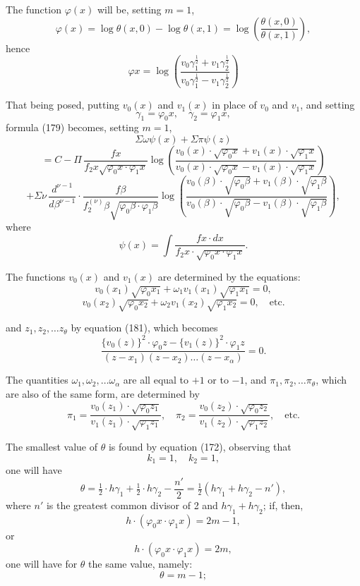 \documentclass{article}
\begin{document}
The function $\varphi(x)$ will be, setting $m = 1$,
\[ \varphi(x) = \log\theta(x,0)-\log\theta(x,1) = \log\left(\frac{\theta(x,0)}{\theta(x,1)}\right), \]
hence
\[ \varphi x = \log\left(\frac{v_0\gamma_1^{\frac{1}{2}}+v_1\gamma_2^{\frac{1}{2}}}{v_0\gamma_1^{\frac{1}{2}}-v_1\gamma_2^{\frac{1}{2}}}\right) \]

That being posed, putting $v_0(x)$ and $v_1(x)$ in place of $v_0$ and $v_1$, and setting
\[ \gamma_1 = \varphi_0 x, \quad \gamma_2 = \varphi_1 x, \]
formula (179) becomes, setting $m = 1$,
\[ \Sigma\omega\psi(x)+\Sigma\pi\psi(z) \]
\[ = C - \Pi\,\frac{f x}{f_2 x\sqrt{\varphi_0 x \cdot \varphi_1 x}}\log\left(\frac{v_0(x) \cdot \sqrt{\varphi_0 x}+v_1(x) \cdot \sqrt{\varphi_1 x}}{v_0(x) \cdot \sqrt{\varphi_0 x}-v_1(x) \cdot \sqrt{\varphi_1 x}}\right) \]
\[ + \Sigma\nu\,\frac{d^{\nu-1}}{d\beta^{\nu-1}} \cdot \frac{f\beta}{f_2^{(\nu)}\beta\sqrt{\varphi_0\beta \cdot \varphi_1\beta}}\log\left(\frac{v_0(\beta) \cdot \sqrt{\varphi_0\beta}+v_1(\beta) \cdot \sqrt{\varphi_1\beta}}{v_0(\beta) \cdot \sqrt{\varphi_0\beta}-v_1(\beta) \cdot \sqrt{\varphi_1\beta}}\right), \tag{202} \]
where
\[ \psi(x) = \int \frac{f x \cdot dx}{f_2 x \cdot \sqrt{\varphi_0 x \cdot \varphi_1 x}}. \]

The functions $v_0(x)$ and $v_1(x)$ are determined by the equations:
\[ v_0(x_1)\sqrt{\varphi_0 x_1}+\omega_1 v_1(x_1)\sqrt{\varphi_1 x_1} = 0, \]
\[ v_0(x_2)\sqrt{\varphi_0 x_2}+\omega_2 v_1(x_2)\sqrt{\varphi_1 x_2} = 0, \quad \text{etc.} \]

and $z_1, z_2, \ldots z_\theta$ by equation (181), which becomes
\[ \frac{\{v_0(z)\}^{2} \cdot \varphi_0 z-\{v_1(z)\}^{2} \cdot \varphi_1 z}{(z-x_1)(z-x_2)\ldots(z-x_\alpha)} = 0. \tag{203} \]

The quantities $\omega_1, \omega_2, \ldots \omega_\alpha$ are all equal to $+1$ or to $-1$, and $\pi_1, \pi_2, \ldots \pi_\theta$, which are also of the same form, are determined by
\[ \pi_1 = \frac{v_0(z_1) \cdot \sqrt{\varphi_0 z_1}}{v_1(z_1) \cdot \sqrt{\varphi_1 z_1}}, \quad \pi_2 = \frac{v_0(z_2) \cdot \sqrt{\varphi_0 z_2}}{v_1(z_2) \cdot \sqrt{\varphi_1 z_2}}, \quad \text{etc.} \]

The smallest value of $\theta$ is found by equation (172), observing that
\[ k_1 = 1, \quad k_2 = 1, \]
one will have
\[ \theta = \tfrac{1}{2} \cdot h\gamma_1 + \tfrac{1}{2} \cdot h\gamma_2 - \frac{n'}{2} = \tfrac{1}{2}(h\gamma_1+h\gamma_2-n'), \]
where $n'$ is the greatest common divisor of 2 and $h\gamma_1+h\gamma_2$; if, then,
\[ h \cdot (\varphi_0 x \cdot \varphi_1 x) = 2m-1, \]
or
\[ h \cdot (\varphi_0 x \cdot \varphi_1 x) = 2m, \]
one will have for $\theta$ the same value, namely:
\[ \theta = m-1; \]
\end{document}
